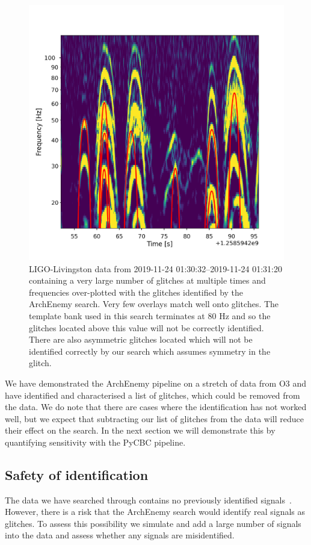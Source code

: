 \begin{figure}
       \centering
    \includegraphics[width=0.7\linewidth]{images/4_archenemy/Section3/3.7/overlay_bad_overlays.pdf}
    \caption{LIGO-Livingston data from 2019-11-24 01:30:32--2019-11-24 01:31:20 containing a very large number of \scl{} glitches at multiple times and frequencies over-plotted with the \scl{} glitches identified by the ArchEnemy search. Very few overlays match well onto \scl{} glitches. The template bank used in this search terminates at $80$ Hz and so the \scl{} glitches located above this value will not be correctly identified. There are also asymmetric \scl{} glitches located which will not be identified correctly by our search which assumes symmetry in the \scl{} glitch.}
    \label{4:fig:overlay_bads}
\end{figure}

We have demonstrated the ArchEnemy pipeline on a stretch of data from O3 and have identified and characterised a list of \scl{} glitches, which could be removed from the data. We do note that there are cases where the identification has not worked well, but we expect that subtracting our list of glitches from the data will reduce their effect on the \gw{} search. In the next section we will demonstrate this by quantifying sensitivity with the PyCBC pipeline.

\subsection{Safety of \scl{} identification}
\label{4:ssec:injsafety}

The data we have searched through contains no previously identified \gw{} signals~\cite{gwtc3:2023}. However, there is a risk that the ArchEnemy search would identify real \gw{} signals as \scl{} glitches. To assess this possibility we simulate and add a large number of \gw{} signals into the data and assess whether any signals are misidentified.

